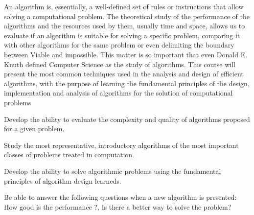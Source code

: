 \begin{syllabus}


\begin{justification}
An algorithm is, essentially, a well-defined set of rules or instructions that allow solving a computational problem.
The theoretical study of the performance of the algorithms and the resources used by them, usually time and space, allows us to evaluate if an algorithm is suitable for solving a specific problem, comparing it with other algorithms for the same problem or even delimiting the boundary between Viable and impossible.
This matter is so important that even Donald E. Knuth defined Computer Science as the study of algorithms.
This course will present the most common techniques used in the analysis and design of efficient algorithms,
with the purpose of learning the fundamental principles of the design, implementation and analysis of algorithms for the solution of computational problems
\end{justification}

\begin{goals} 
\item Develop the ability to evaluate the complexity and quality of algorithms proposed for a given problem.
\item Study the most representative, introductory algorithms of the most important classes of problems treated in computation.
\item Develop the ability to solve algorithmic problems using the fundamental principles of algorithm design learneds.
\item Be able to answer the following questions when a new algorithm is presented: How good is the performance ?, Is there a better way to solve the problem?
\end{goals}

\begin{outcomes}
    \item {} %
    \item {} %
    \item {} %
    \item {} %
\end{outcomes}


\end{syllabus}
